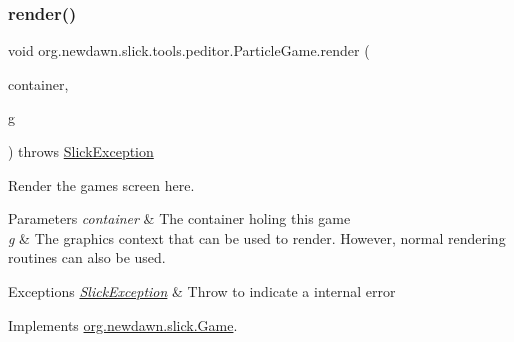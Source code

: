 \subsubsection{\texorpdfstring{render()}{render()}}
{\footnotesize\ttfamily void org.\+newdawn.\+slick.\+tools.\+peditor.\+Particle\+Game.\+render (\begin{DoxyParamCaption}\item[{\mbox{\hyperlink{classorg_1_1newdawn_1_1slick_1_1_game_container}{Game\+Container}}}]{container,  }\item[{\mbox{\hyperlink{classorg_1_1newdawn_1_1slick_1_1_graphics}{Graphics}}}]{g }\end{DoxyParamCaption}) throws \mbox{\hyperlink{classorg_1_1newdawn_1_1slick_1_1_slick_exception}{Slick\+Exception}}\hspace{0.3cm}{\ttfamily [inline]}}

Render the game\textquotesingle{}s screen here.


\begin{DoxyParams}{Parameters}
{\em container} & The container holing this game \\
\hline
{\em g} & The graphics context that can be used to render. However, normal rendering routines can also be used. \\
\hline
\end{DoxyParams}

\begin{DoxyExceptions}{Exceptions}
{\em \mbox{\hyperlink{classorg_1_1newdawn_1_1slick_1_1_slick_exception}{Slick\+Exception}}} & Throw to indicate a internal error \\
\hline
\end{DoxyExceptions}


Implements \mbox{\hyperlink{interfaceorg_1_1newdawn_1_1slick_1_1_game_af1a4670d43eb3ba04dfcf55ab1975b64}{org.\+newdawn.\+slick.\+Game}}.



